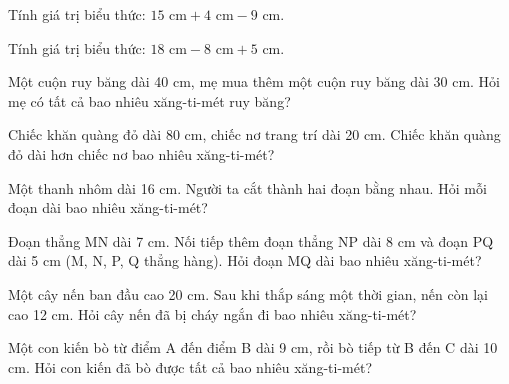 \begin{ex}
Tính giá trị biểu thức: $15\text{ cm} + 4\text{ cm} - 9\text{ cm}$.
\end{ex}

\begin{ex}
Tính giá trị biểu thức: $18\text{ cm} - 8\text{ cm} + 5\text{ cm}$.
\end{ex}

\begin{ex}
Một cuộn ruy băng dài 40 cm, mẹ mua thêm một cuộn ruy băng dài 30 cm. Hỏi mẹ có tất cả bao nhiêu xăng-ti-mét ruy băng?
\end{ex}

\begin{ex}
Chiếc khăn quàng đỏ dài 80 cm, chiếc nơ trang trí dài 20 cm. Chiếc khăn quàng đỏ dài hơn chiếc nơ bao nhiêu xăng-ti-mét?
\end{ex}

\begin{ex}
Một thanh nhôm dài 16 cm. Người ta cắt thành hai đoạn bằng nhau. Hỏi mỗi đoạn dài bao nhiêu xăng-ti-mét?
\end{ex}

\begin{ex}
Đoạn thẳng MN dài 7 cm. Nối tiếp thêm đoạn thẳng NP dài 8 cm và đoạn PQ dài 5 cm (M, N, P, Q thẳng hàng). Hỏi đoạn MQ dài bao nhiêu xăng-ti-mét?
\end{ex}

\begin{ex}
Một cây nến ban đầu cao 20 cm. Sau khi thắp sáng một thời gian, nến còn lại cao 12 cm. Hỏi cây nến đã bị cháy ngắn đi bao nhiêu xăng-ti-mét?
\end{ex}

\begin{ex}
Một con kiến bò từ điểm A đến điểm B dài 9 cm, rồi bò tiếp từ B đến C dài 10 cm. Hỏi con kiến đã bò được tất cả bao nhiêu xăng-ti-mét?
\end{ex}


